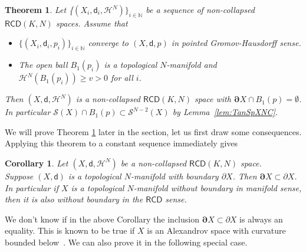 \documentclass[a4paper]{amsart}
\theoremstyle{plain}
\newtheorem{theorem}[lemma]{Theorem}
\newtheorem{corollary}[lemma]{Corollary}
\theoremstyle{definition}
\numberwithin{equation}{section}
\newcommand{\N}{\mathbb{N}}
\renewcommand{\S}{\mathcal{S}}
\newcommand{\RCD}{\mathsf{RCD}}
\newcommand{\sfd}{\mathsf d}
\newcommand{\cH}{\mathcal{H}}
\newcommand{\bRCD}{\boldsymbol\partial}
\begin{document}
{\begin{theorem}\label{thm-no-bry-main}
Let \{$(X_{i}, \sfd_{i},  \cH^{N})\}_{i\in \N}$ be a sequence of non-collapsed $\RCD(K,N)$ spaces. Assume that
\begin{itemize}
\item $\{(X_{i}, \sfd_{i}, p_{i})\}_{i\in \N}$ converge to  $(X, \sfd, p)$ in pointed Gromov-Hausdorff sense.
\item The open ball $B_1(p_i)$ is a topological $N$-manifold and $\cH^{N}(B_1(p_i))\ge v>0$ for all $i$.
\end{itemize}
Then $(X, \sfd, \cH^{N})$ is a non-collapsed $\RCD(K,N)$ space with  $\bRCD X \cap B_1(p)=\emptyset$.
\\ In particular $\S(X)\cap B_1(p)\subset \S^{N-2}(X)$ by Lemma~\ref{lem:TanSpXNC}.
\end{theorem}

{We will prove Theorem \ref{thm-no-bry-main} later in the section, let us first draw some consequences.} Applying this theorem to a constant sequence immediately gives

\begin{corollary}\label{manifold-no-boundary}
Let $(X,\sfd,\cH^{N})$ be a non-collapsed $\RCD(K,N)$ space. 
\\Suppose $(X,\sfd)$ is a topological $N$-manifold with boundary $\partial X$. Then  $\bRCD X \subset \partial X$.\\In particular if   $X$ is a topological $N$-manifold without boundary in manifold sense, then it is also without boundary in the $\RCD$ sense.

\end{corollary}
{
We don't know if in the above Corollary the inclusion $\bRCD X \subset \partial X$ is always an equality.  This is known to be true if $X$ is an Alexandrov space with curvature bounded below~\cite{Per-stab}.
We can also prove it in the following special case.

}}
\end{document}
